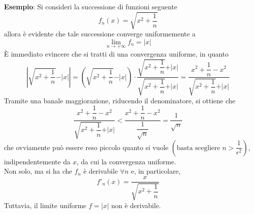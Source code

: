 \documentclass[a4paper]{extarticle}
\begin{document}
\vspace{2em}
\noindent
\textbf{Esempio}: Si consideri la successione di funzioni seguente
\[f_n(x) = \sqrt{x^2 + \frac{1}{n}}\]
allora è evidente che tale successione converge uniformemente a
\[\lim_{n \to +\infty} f_n = \vert x \vert\]
È immediato evincere che si tratti di una convergenza uniforme, in quanto
\[\left \vert \sqrt{x^2 + \frac{1}{n}} - \vert x \vert \right \vert = \left(\sqrt{x^2 + \frac{1}{n}} - \vert x \vert \right)\cdot \dfrac{\sqrt{x^2 + \dfrac{1}{n}}+ \vert x \vert }{\sqrt{x^2 + \dfrac{1}{n}} + \vert x \vert} = \dfrac{x^2 + \dfrac{1}{n} - x^2}{\sqrt{x^2 + \dfrac{1}{n}} + \vert x \vert}\]
Tramite una banale maggiorazione, riducendo il denominatore, si ottiene che
\[\dfrac{x^2 + \dfrac{1}{n} - x^2}{\sqrt{x^2 + \dfrac{1}{n}} + \vert x \vert} < \dfrac{x^2 + \dfrac{1}{n} - x^2}{\dfrac{1}{\sqrt{n}}} = \dfrac{1}{\sqrt{n}}\]
che ovviamente può essere reso piccolo quanto si vuole $\left(\text{basta scegliere }n>\dfrac{1}{\epsilon^2}\right)$, indipendentemente da $x$, da cui la convergenza uniforme.\\
Non solo, ma si ha che $f_n$ è derivabile $\forall n$ e, in particolare,
\[f'_n(x) = \dfrac{x}{\sqrt{x^2 + \dfrac{1}{n}}}\]
Tuttavia, il limite uniforme $f=\vert x\vert$ non è derivabile.
\end{document}
